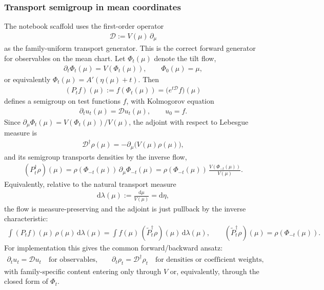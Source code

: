 \documentclass[a4paper,11pt]{article}
\numberwithin{equation}{section}
\theoremstyle{plain}
\theoremstyle{definition}
\theoremstyle{remark}
\newcommand{\1}{\ensuremath{\mathds{1}}\xspace}
\newcommand{\dd}{\ensuremath{{\textrm{d}}}\xspace}
\begin{document}
\subsubsection{Transport semigroup in mean coordinates}
The notebook scaffold uses the first-order operator
\begin{align}
\mathcal D:=V(\mu)\,\partial_\mu
\label{eq:qvf-transport-generator}
\end{align}
as the family-uniform transport generator. This is the correct forward generator for observables on the mean chart.
Let $\Phi_t(\mu)$ denote the tilt flow,
\begin{align}
\partial_t\Phi_t(\mu)=V(\Phi_t(\mu)),
\qquad
\Phi_0(\mu)=\mu,
\label{eq:qvf-flow}
\end{align}
or equivalently $\Phi_t(\mu)=A'(\eta(\mu)+t)$. Then
\begin{align}
(P_t f)(\mu):=f(\Phi_t(\mu))=\big(e^{t\mathcal D}f\big)(\mu)
\label{eq:qvf-forward-semigroup}
\end{align}
defines a semigroup on test functions $f$, with Kolmogorov equation
\begin{align}
\partial_t u_t(\mu)=\mathcal D u_t(\mu),
\qquad
u_0=f.
\label{eq:qvf-forward-kolmogorov}
\end{align}
Since $\partial_\mu\Phi_t(\mu)=V(\Phi_t(\mu))/V(\mu)$, the adjoint with respect to Lebesgue measure is
\begin{align}
\mathcal D^\dagger\rho(\mu)=-\partial_\mu\!\big(V(\mu)\rho(\mu)\big),
\label{eq:qvf-adjoint-generator}
\end{align}
and its semigroup transports densities by the inverse flow,
\begin{align}
(P_t^\dagger\rho)(\mu)
=\rho(\Phi_{-t}(\mu))\,\partial_\mu\Phi_{-t}(\mu)
=\rho(\Phi_{-t}(\mu))\,\frac{V(\Phi_{-t}(\mu))}{V(\mu)}.
\label{eq:qvf-adjoint-semigroup}
\end{align}
Equivalently, relative to the natural transport measure
\begin{align}
\dd\lambda(\mu):=\frac{\dd\mu}{V(\mu)}=\dd\eta,
\label{eq:qvf-transport-measure}
\end{align}
the flow is measure-preserving and the adjoint is just pullback by the inverse characteristic:
\begin{align}
\int (P_t f)(\mu)\,\rho(\mu)\,\dd\lambda(\mu)
=\int f(\mu)\,(\widetilde P_t^\dagger\rho)(\mu)\,\dd\lambda(\mu),
\qquad
(\widetilde P_t^\dagger\rho)(\mu)=\rho(\Phi_{-t}(\mu)).
\label{eq:qvf-adjoint-lambda}
\end{align}
For implementation this gives the common forward/backward ansatz:
\begin{align}
\partial_t u_t=\mathcal D u_t
\quad\text{for observables,}
\qquad
\partial_t\rho_t=\mathcal D^\dagger\rho_t
\quad\text{for densities or coefficient weights,}
\label{eq:qvf-forward-backward-ansatz}
\end{align}
with family-specific content entering only through $V$ or, equivalently, through the closed form of $\Phi_t$.
\end{document}
